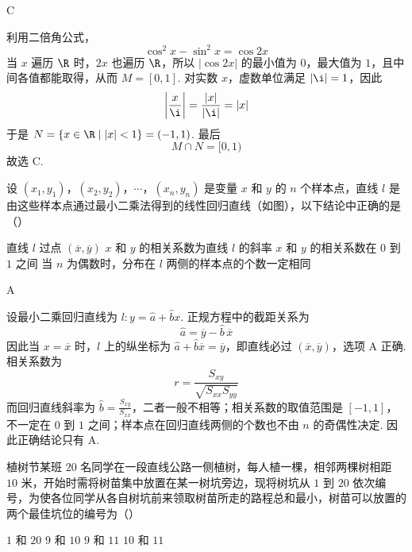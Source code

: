 \begin{answer}
C
\end{answer}

\begin{solution}
利用二倍角公式，
\[
\cos^2x-\sin^2x=\cos2x
\]
当 \(x\) 遍历 \(\R\) 时，\(2x\) 也遍历 \(\R\)，所以 \(|\cos2x|\) 的最小值为 \(0\)，最大值为 \(1\)，且中间各值都能取得，从而 \(M=[0,1]\). 对实数 \(x\)，虚数单位满足 \(|\i|=1\)，因此
\[
\left|\frac{x}{\i}\right|=\frac{|x|}{|\i|}=|x|
\]
于是 \(N=\{x\in\R\mid |x|<1\}=(-1,1)\). 最后
\[
M\cap N=[0,1)
\]
故选 C.
\end{solution}

\begin{problem}
设 \((x_{1}, y_{1})\)，\((x_{2}, y_{2})\)，\(\cdots\)，\((x_{n}, y_{n})\) 是变量 \(x\) 和 \(y\) 的 \(n\) 个样本点，直线 \(l\) 是由这些样本点通过最小二乘法得到的线性回归直线（如图），以下结论中正确的是（\quad）


\choices
    {直线 \(l\) 过点 \((\overline{x}, \overline{y})\)}
    {\(x\) 和 \(y\) 的相关系数为直线 \(l\) 的斜率}
    {\(x\) 和 \(y\) 的相关系数在 \(0\) 到 \(1\) 之间}
    {当 \(n\) 为偶数时，分布在 \(l\) 两侧的样本点的个数一定相同}
\end{problem}

\begin{answer}
A
\end{answer}

\begin{solution}
设最小二乘回归直线为 \(l:y=\hat a+\hat b x\). 正规方程中的截距关系为
\[
\hat a=\overline y-\hat b\,\overline x
\]
因此当 \(x=\overline x\) 时，\(l\) 上的纵坐标为 \(\hat a+\hat b\overline x=\overline y\)，即直线必过 \((\overline x,\overline y)\)，选项 A 正确. 相关系数为
\[
r=\frac{S_{xy}}{\sqrt{S_{xx}S_{yy}}}
\]
而回归直线斜率为 \(\hat b=\frac{S_{xy}}{S_{xx}}\)，二者一般不相等；相关系数的取值范围是 \([-1,1]\)，不一定在 \(0\) 到 \(1\) 之间；样本点在回归直线两侧的个数也不由 \(n\) 的奇偶性决定. 因此正确结论只有 A.
\end{solution}

\begin{problem}
植树节某班 \(20\) 名同学在一段直线公路一侧植树，每人植一棵，相邻两棵树相距 \(10\text{ 米}\)，开始时需将树苗集中放置在某一树坑旁边，现将树坑从 \(1\) 到 \(20\) 依次编号，为使各位同学从各自树坑前来领取树苗所走的路程总和最小，树苗可以放置的两个最佳坑位的编号为（\quad）

\choices
    {\(1\) 和 \(20\)}
    {\(9\) 和 \(10\)}
    {\(9\) 和 \(11\)}
    {\(10\) 和 \(11\)}
\end{problem}


